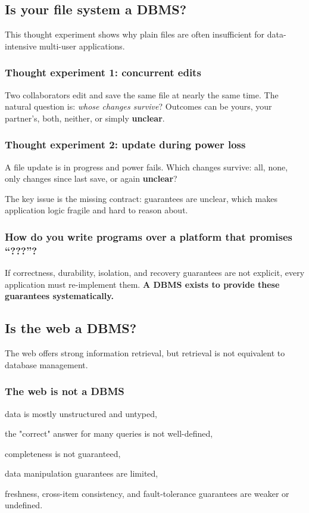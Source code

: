 \documentclass[../../dis.tex]{subfiles}
\begin{document}
\subsection{Is your file system a DBMS?}
This thought experiment shows why plain files are often insufficient for data-intensive multi-user applications.

\subsubsection*{Thought experiment 1: concurrent edits}
Two collaborators edit and save the same file at nearly the same time. The natural question is: \emph{whose changes survive}? Outcomes can be yours, your partner's, both, neither, or simply \textbf{unclear}.

\subsubsection*{Thought experiment 2: update during power loss}
A file update is in progress and power fails. Which changes survive: all, none, only changes since last save, or again \textbf{unclear}?

The key issue is the missing contract: guarantees are unclear, which makes application logic fragile and hard to reason about.

\subsubsection*{How do you write programs over a platform that promises ``???''?}
If correctness, durability, isolation, and recovery guarantees are not explicit, every application must re-implement them. \textbf{A DBMS exists to provide these guarantees systematically.}

\subsection{Is the web a DBMS?}
The web offers strong information retrieval, but retrieval is not equivalent to database management.

\subsubsection*{The web is not a DBMS}
\begin{dashlist}
    \item data is mostly unstructured and untyped,
    \item the "correct" answer for many queries is not well-defined,
    \item completeness is not guaranteed,
    \item data manipulation guarantees are limited,
    \item freshness, cross-item consistency, and fault-tolerance guarantees are weaker or undefined.
\end{dashlist}
\end{document}

